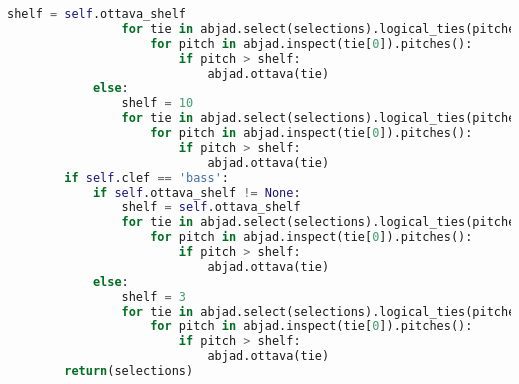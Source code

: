 \begin{lstlisting}[language=Python, caption=ClefHandler]
                shelf = self.ottava_shelf
                for tie in abjad.select(selections).logical_ties(pitched=True):
                    for pitch in abjad.inspect(tie[0]).pitches():
                        if pitch > shelf:
                            abjad.ottava(tie)
            else:
                shelf = 10
                for tie in abjad.select(selections).logical_ties(pitched=True):
                    for pitch in abjad.inspect(tie[0]).pitches():
                        if pitch > shelf:
                            abjad.ottava(tie)
        if self.clef == 'bass':
            if self.ottava_shelf != None:
                shelf = self.ottava_shelf
                for tie in abjad.select(selections).logical_ties(pitched=True):
                    for pitch in abjad.inspect(tie[0]).pitches():
                        if pitch > shelf:
                            abjad.ottava(tie)
            else:
                shelf = 3
                for tie in abjad.select(selections).logical_ties(pitched=True):
                    for pitch in abjad.inspect(tie[0]).pitches():
                        if pitch > shelf:
                            abjad.ottava(tie)
        return(selections)
\end{lstlisting}
\doublespace

